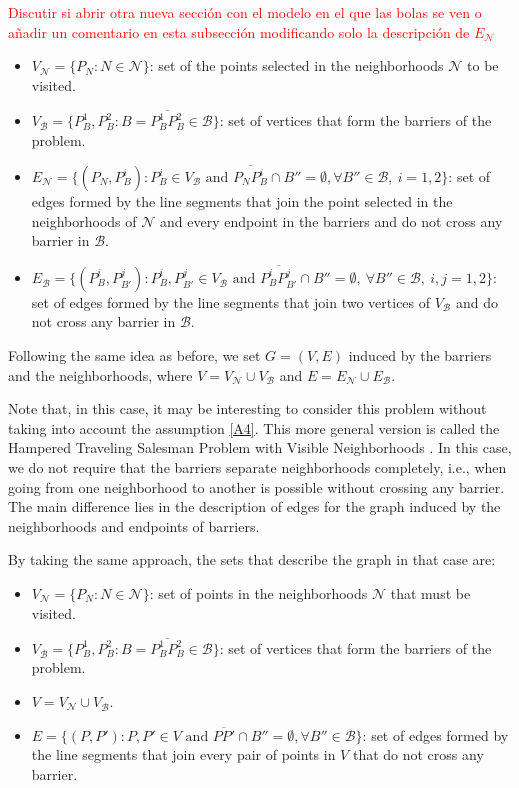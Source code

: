\documentclass[a4paper]{elsarticle}
\newcommand{\TSPVN}{{\sf{H-TSPVN}\xspace }}
\newcommand{\B}{{\mathcal B}}
\newcommand{\VB}{{V^{}_{\mathcal B}}}
\newcommand{\EB}{{E^{}_{\mathcal B}}}
\newcommand{\VN}{{V^{}_{\mathcal N}}}
\newcommand{\EN}{{E^{}_{\mathcal N}}}
\newcommand{\JP}[1]{{\color{armygreen}#1}}
\newcommand{\CV}[1]{{\color{atomictangerine}#1}}
\begin{document}
	\textcolor{red}{Discutir si abrir otra nueva sección con el modelo en el que las bolas se ven o añadir un comentario en esta subsección modificando solo la descripción de $\EN$}	
	\begin{itemize}
		\item $\VN=\{P_N:N\in\mathcal N\}$: set of the points selected in the neighborhoods $\mathcal N$ to be visited.
		\item $\VB=\{P^1_B, P^2_B:B=\overline{P^1_B P^2_B}\in \mathcal B\}$: set of vertices that form the barriers of the problem.
		\item $\EN=\{(P_N, P^i_{B}):P^i_B\in V_\B\text{ and } \overline{P_NP^i_B}\cap B''=\emptyset,\forall B''\in\B,\:i=1,2\}$: set of edges formed by the line segments that join the point selected in the neighborhoods of $\mathcal N$ and every endpoint in the barriers and do not cross any barrier in $\B$.
		\item $\EB=\{(P^{i}_B, P^{j}_{B'}):P^i_B, P^j_{B'}\in \VB \text{ and } \overline{P^i_B P^j_{B'}}\cap B''=\emptyset,\:\forall B''\in\mathcal B,\:i, j=1,2\}$: set of edges formed by the line segments that join two vertices of $V_{\mathcal B}$ and do not cross any barrier in $\B$.
	\end{itemize} 
	
	\JP{Following the same idea as before, we set $G=(V,E)$ induced by the barriers and the neighborhoods, where $V=\VN\cup\VB$ and $E=\EN\cup\EB$.}
	
	\CV{Note that, in this case, it may be interesting to consider this problem without taking into account the assumption \ref{A4}. This more general version is called the Hampered Traveling Salesman Problem with Visible Neighborhoods \TSPVN.} In this case, we do not require that the barriers separate neighborhoods completely, i.e., when going from one neighborhood to another is possible without crossing any barrier. The main difference lies in the description of edges for the graph induced by the neighborhoods and endpoints of barriers.
	
	By taking the same approach, the sets that describe the graph in that case are:
	
	\begin{itemize}
		\item $\VN=\{P_N:N\in\mathcal N\}$: set of points in the neighborhoods $\mathcal N$ that must be visited.
		\item $\VB=\{P^1_B, P^2_B:B=\overline{P^1_B P^2_B}\in \mathcal B\}$: set of vertices that form the barriers of the problem.
		\item $V = \VN \cup \VB$.
		\item $E=\{(P, P'):P, P' \in V \text{ and } \overline{PP'}\cap B''=\emptyset,\forall B''\in\B\}$: set of edges formed by the line segments that join every pair of points in $V$ that do not cross any barrier.
	\end{itemize} 
	
\end{document}
